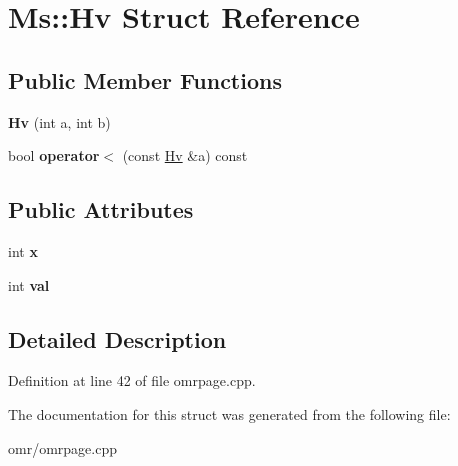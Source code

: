\hypertarget{struct_ms_1_1_hv}{}\section{Ms\+:\+:Hv Struct Reference}
\label{struct_ms_1_1_hv}
\subsection*{Public Member Functions}
\begin{DoxyCompactItemize}
\item 
\mbox{\label{struct_ms_1_1_hv_aa9360a34aa452c31ea608d655931b5ff}} 
{\bfseries Hv} (int a, int b)
\item 
\mbox{\label{struct_ms_1_1_hv_a7c7639b7aa8571a132f2397333131e16}} 
bool {\bfseries operator$<$} (const \hyperlink{struct_ms_1_1_hv}{Hv} \&a) const
\end{DoxyCompactItemize}
\subsection*{Public Attributes}
\begin{DoxyCompactItemize}
\item 
\mbox{\label{struct_ms_1_1_hv_aee9f404693e66abe121dbc454ac75f13}} 
int {\bfseries x}
\item 
\mbox{\label{struct_ms_1_1_hv_ad239ee313c81ef91c1ab075c04009148}} 
int {\bfseries val}
\end{DoxyCompactItemize}


\subsection{Detailed Description}


Definition at line 42 of file omrpage.\+cpp.



The documentation for this struct was generated from the following file\+:\begin{DoxyCompactItemize}
\item 
omr/omrpage.\+cpp\end{DoxyCompactItemize}
